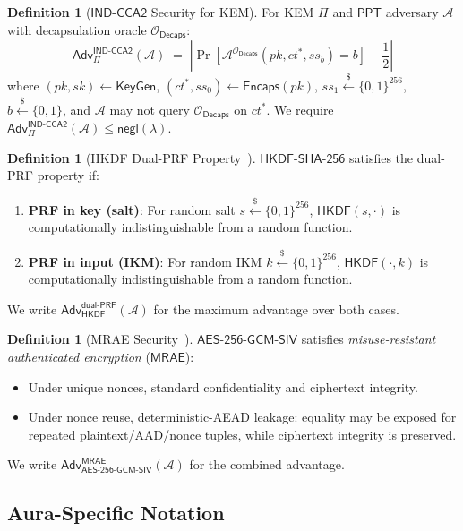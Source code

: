\documentclass[11pt,a4paper]{article}
\theoremstyle{definition}
\newtheorem{definition}[theorem]{Definition}
\theoremstyle{remark}
\newcommand{\secpar}{\lambda}
\newcommand{\negl}{\mathsf{negl}}
\newcommand{\ppt}{\mathsf{PPT}}
\newcommand{\adv}{\mathsf{Adv}}
\newcommand{\advA}{\mathcal{A}}
\newcommand{\oracle}{\mathcal{O}}
\newcommand{\HKDF}{\mathsf{HKDF}}
\newcommand{\SHA}{\mathsf{SHA\text{-}256}}
\newcommand{\AEAD}{\mathsf{AES\text{-}256\text{-}GCM\text{-}SIV}}
\newcommand{\KeyGen}{\mathsf{KeyGen}}
\newcommand{\Encaps}{\mathsf{Encaps}}
\newcommand{\Decaps}{\mathsf{Decaps}}
\newcommand{\INDCCA}{\mathsf{IND\text{-}CCA2}}
\newcommand{\MRAE}{\mathsf{MRAE}}
\newcommand{\dualPRF}{\mathsf{dual\text{-}PRF}}
\newcommand{\getsr}{\xleftarrow{\$}}
\newcommand{\bits}{\{0,1\}}
\begin{document}
\begin{definition}[$\INDCCA$ Security for KEM]
\label{def:indcca}
For KEM $\Pi$ and $\ppt$ adversary $\advA$ with decapsulation oracle
$\oracle_{\Decaps}$:
\[
  \adv^{\INDCCA}_\Pi(\advA) \;=\;
  \left|\Pr\!\left[\advA^{\oracle_{\Decaps}}(\mathit{pk}, \mathit{ct}^*, \mathit{ss}_b) = b\right] - \frac{1}{2}\right|
\]
where $(\mathit{pk}, \mathit{sk}) \gets \KeyGen$,
$(\mathit{ct}^*, \mathit{ss}_0) \gets \Encaps(\mathit{pk})$,
$\mathit{ss}_1 \getsr \bits^{256}$, $b \getsr \{0,1\}$, and $\advA$ may not
query $\oracle_{\Decaps}$ on $\mathit{ct}^*$.  We require
$\adv^{\INDCCA}_\Pi(\advA) \leq \negl(\secpar)$.
\end{definition}

\begin{definition}[HKDF Dual-PRF Property~\cite{krawczyk2010}]
\label{def:dualprf}
$\HKDF\text{-}\SHA$ satisfies the dual-PRF property if:
\begin{enumerate}[nosep]
  \item \textbf{PRF in key (salt)}: For random salt $s \getsr \bits^{256}$,
        $\HKDF(s, \cdot)$ is computationally indistinguishable from a random function.
  \item \textbf{PRF in input (IKM)}: For random IKM $k \getsr \bits^{256}$,
        $\HKDF(\cdot, k)$ is computationally indistinguishable from a random function.
\end{enumerate}
We write $\adv^{\dualPRF}_{\HKDF}(\advA)$ for the maximum advantage over
both cases.
\end{definition}

\begin{definition}[MRAE Security~\cite{rfc8452}]
\label{def:mrae}
$\AEAD$ satisfies \emph{misuse-resistant authenticated encryption} ($\MRAE$):
\begin{itemize}[nosep]
  \item Under unique nonces, standard confidentiality and ciphertext integrity.
  \item Under nonce reuse, deterministic-AEAD leakage: equality may be exposed for
        repeated plaintext/AAD/nonce tuples, while ciphertext integrity is preserved.
\end{itemize}
We write $\adv^{\MRAE}_{\AEAD}(\advA)$ for the combined advantage.
\end{definition}

\subsection{Aura-Specific Notation}
\label{subsec:epp-notation}
\end{document}
